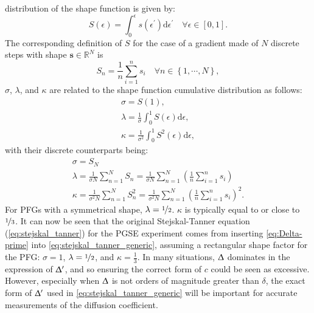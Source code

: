 distribution of the shape function is given by:
\begin{equation}
    S(\epsilon) = \int_0^{\epsilon} s\left(\epsilon^{\prime}\right)
            \mathrm{d} \epsilon^{\prime} \quad \forall \epsilon \in [0, 1].
\end{equation}
The corresponding definition of $S$ for the case of a gradient made of $N$
discrete steps with shape $\symbf{s} \in \mathbb{R}^{N}$ is
\begin{equation}
    S_n =
        \frac{1}{n} \sum_{i = 1}^{n} s_i \quad
        \forall n \in \left\lbrace 1, \cdots, N\right\rbrace,
\end{equation}
$\sigma$, $\lambda$, and $\kappa$ are related to the shape function cumulative
distribution as follows:
\begin{subequations}
    \begin{gather}
        \sigma = S(1),\\
        \lambda = \frac{1}{\sigma} \int_0^1 S(\epsilon) \mathrm{d} \epsilon,\\
        \kappa = \frac{1}{\sigma^2} \int_0^1 S^2(\epsilon) \mathrm{d} \epsilon,
    \end{gather}
\end{subequations}
with their discrete counterparts being:
\begin{subequations}
    \begin{gather}
        \sigma = S_{N} \\
        \lambda = \frac{1}{\sigma N} \sum_{n = 1}^{N} S_n
            = \frac{1}{\sigma N} \sum_{n=1}^{N}
            \left(\frac{1}{n} \sum_{i=1}^{n} s_i\right) \\
        \kappa = \frac{1}{\sigma^2 N} \sum_{n = 1}^{N} S^2_n
            = \frac{1}{\sigma^2 N} \sum_{n = 1}^{N}
            \left(\frac{1}{n} \sum_{i=1}^{n} s_i\right)^2.
    \end{gather}
\end{subequations}
For \acp{PFG} with a symmetrical shape, $\lambda = \nicefrac{1}{2}$. $\kappa$
is typically equal to or close to $\nicefrac{1}{3}$. It can now be seen that
the original Stejskal-Tanner equation (\cref{eq:stejskal_tanner}) for the
\ac{PGSE} experiment comes from
inserting \cref{eq:Delta-prime} into \cref{eq:stejskal_tanner_generic},
assuming a rectangular shape factor for the \acs{PFG}:
$\sigma = 1$,  $\lambda = \nicefrac{1}{2}$, and  $\kappa = \frac{1}{3}$.
In many situations,  $\Updelta$
dominates in the expression of $\Updelta^{\prime}$, and so ensuring the correct
form of $c$ could be seen as excessive. However, especially when  $\Updelta$ is
not orders of magnitude greater than $\delta$, the exact form of
$\Updelta^{\prime}$ used in \cref{eq:stejskal_tanner_generic} will be
important for accurate measurements of the diffusion coefficient.

